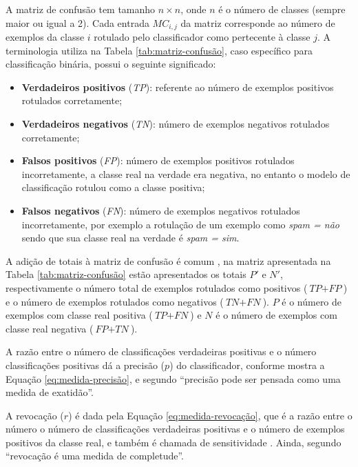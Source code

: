        A matriz de confusão tem tamanho $n \times n$, onde $n$ é o número de classes (sempre maior ou igual a 2).
        Cada entrada ${MC}_{i,j}$ da matriz corresponde ao número de exemplos da classe $i$ rotulado pelo classificador como pertecente à classe $j$.
        A terminologia utiliza na Tabela \ref{tab:matriz-confusão}, caso específico para classificação binária, possui o seguinte significado:
        \begin{itemize}
            \item \textbf{Verdadeiros positivos} (\textit{TP}): referente ao número de exemplos positivos rotulados corretamente;
            
            \item \textbf{Verdadeiros negativos} (\textit{TN}): número de exemplos negativos rotulados corretamente;
            
            \item \textbf{Falsos positivos} (\textit{FP}): número de exemplos positivos rotulados incorretamente, a classe real na verdade era negativa, no entanto o modelo de classificação rotulou como a classe positiva;
            
            \item \textbf{Falsos negativos} (\textit{FN}): número de exemplos negativos rotulados incorretamente, por exemplo a rotulação de um exemplo como \textit{spam = não} sendo que sua classe real na verdade é \textit{spam = sim}.
        \end{itemize}
        A adição de totais à matriz de confusão é comum \cite[p.~366]{Han:2011:DMC:1972541}, na matriz apresentada na Tabela \ref{tab:matriz-confusão} estão apresentados os totais $P'$ e $N'$, respectivamente o número total de exemplos rotulados como positivos ($\textit{TP} + \textit{FP}$) e o número de exemplos rotulados como negativos ($\textit{TN} + \textit{FN}$).
        $P$ é o número de exemplos com classe real positiva ($\textit{TP} + \textit{FN}$) e $N$ é o número de exemplos com classe real negativa ($\textit{FP} + \textit{TN}$).
        
        A razão entre o número de classificações verdadeiras positivas e o número classificações positivas dá a precisão ($p$) do classificador, conforme mostra a Equação \ref{eq:medida-precisão}, e segundo  ``precisão pode ser pensada como uma medida de exatidão''.
        
        A revocação ($r$) é dada pela Equação \ref{eq:medida-revocação}, que é a razão entre o número o número de classificações verdadeiras positivas e o número de exemplos positivos da classe real, e também é chamada de sensitividade \cite[p.~364--365]{Han:2011:DMC:1972541}.
        Ainda, segundo   ``revocação é uma medida de completude''.
        
